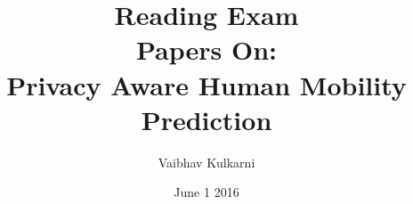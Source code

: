 \documentclass[12pt, a4paper]{article}
\begin{document}
\pagestyle{fancy}


\title{\vspace{50 mm} \huge {Reading Exam} \vspace{10 mm}\\ \Large {Papers On: \vspace{2 mm} \\ Privacy Aware Human Mobility Prediction\vspace{10 mm}}}
\author{\vspace{0.07 mm}\large Vaibhav Kulkarni}
\date{\large June 1 2016}
\maketitle

\thispagestyle{empty}

\newpage

\fancyhead[C]{}
\fancyhead[L]{}
\fancyhead[R]{} 
\fancyfoot[L]{}
\fancyfoot[C]{} 

\setcounter{tocdepth}{1}
\tableofcontents








\newpage


\end{document}
